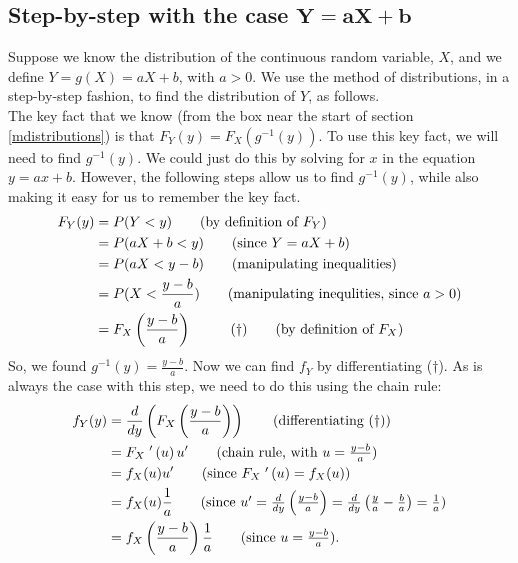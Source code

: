 \subsection{Step-by-step with the case $\boldsymbol{Y = aX + b}$} \label{caseY=aX+b}
Suppose we know the distribution of the continuous random variable, $X$, and we define $Y = g(X) = aX + b$, with $a > 0$. We use the method of distributions, in a step-by-step fashion, to find the distribution of $Y$, as follows. \\

\noindent The key fact that we know (from the box near the start of section \ref{mdistributions}) is that $F_Y(y) = F_X(g^{-1}(y))$. To use this key fact, we will need to find $g^{-1}(y)$. We could just do this by solving for $x$ in the equation $y = ax + b$. However, the following steps allow us to find $g^{-1}(y)$, while also making it easy for us to remember the key fact.
\begin{align*}
F_Y(y) & = P(Y < y) \tag{by definition of $F_Y$} \\
	  & = P(aX + b < y) \tag{since $Y = aX+b$} \\
	  & = P(aX < y - b) \tag{manipulating inequalities} \\
	  & = P(X < \frac{y - b}{a}) \tag{manipulating inequlities, since $a > 0$}  \\
	  & = F_X\left( \frac{y - b}{a}\right) \;\;\;\;\;\;\;\;\;\; (\dagger) \tag{by definition of $F_X$}
\end{align*}
So, we found $g^{-1}(y) = \frac{y - b}{a}$. Now we can find $f_Y$ by differentiating ($\dagger$). As is always the case with this step, we need to do this using the chain rule:
\begin{align*}
f_Y(y) & = \frac{d}{dy}\brac{F_X\brac{ \frac{y - b}{a}}} \tag{differentiating ($\dagger$)} \\
 	& = F_X\;'\brac{u}u' \tag{chain rule, with $u = \frac{y - b}{a}$} \\
 	& = f_X(u)u' \tag{since $F_X\;'\brac{u} = f_X(u)$} \\
 	& = f_X(u)\frac{1}{a} \tag{since $u' = \frac{d}{dy}\brac{\frac{y-b}{a}} = \frac{d}{dy}\brac{\frac{y}{a} - \frac{b}{a}} = \frac{1}{a}$} \\
 	& = f_X\brac{\frac{y-b}{a}}\frac{1}{a} \tag{since $u = \frac{y-b}{a}$}.
\end{align*}


